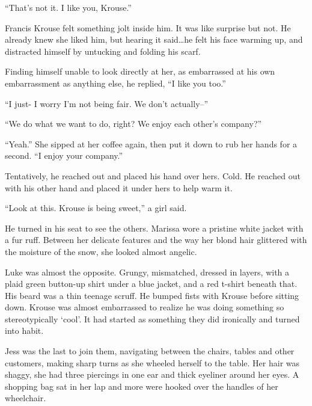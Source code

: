 ``That's not it.  I like you, Krouse.''



Francis Krouse felt something jolt inside him.  It was like surprise but not.  He already knew she liked him, but hearing it said\ldots  he felt his face warming up, and distracted himself by untucking and folding his scarf.



Finding himself unable to look directly at her, as embarrassed at his own embarrassment as anything else, he replied, ``I like you too.''



``I just- I worry I'm not being fair.  We don't actually--''



``We do what we want to do, right?  We enjoy each other's company?''



``Yeah.''  She sipped at her coffee again, then put it down to rub her hands for a second.  ``I enjoy your company.''



Tentatively, he reached out and placed his hand over hers.  Cold.  He reached out with his other hand and placed it under hers to help warm it.



``Look at this.  Krouse is being sweet,'' a girl said.



He turned in his seat to see the others.  Marissa wore a pristine white jacket with a fur ruff.  Between her delicate features and the way her blond hair glittered with the moisture of the snow, she looked almost angelic.



Luke was almost the opposite.  Grungy, mismatched, dressed in layers, with a plaid green button-up shirt under a blue jacket, and a red t-shirt beneath that.  His beard was a thin teenage scruff.  He bumped fists with Krouse before sitting down.  Krouse was almost embarrassed to realize he was doing something so stereotypically `cool'.  It had started as something they did ironically and turned into habit.



Jess was the last to join them, navigating between the chairs, tables and other customers, making sharp turns as she wheeled herself to the table.  Her hair was shaggy, she had three piercings in one ear and thick eyeliner around her eyes.  A shopping bag sat in her lap and more were hooked over the handles of her wheelchair.



